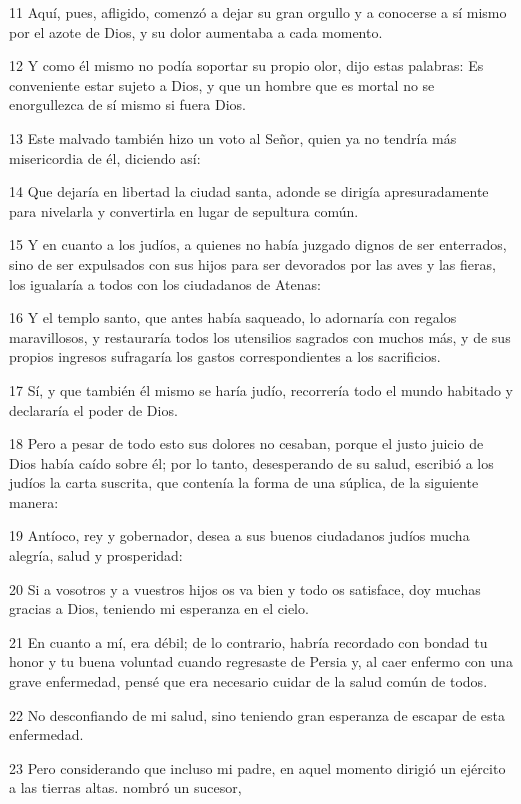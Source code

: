 \par 11 Aquí, pues, afligido, comenzó a dejar su gran orgullo y a conocerse a sí mismo por el azote de Dios, y su dolor aumentaba a cada momento.
\par 12 Y como él mismo no podía soportar su propio olor, dijo estas palabras: Es conveniente estar sujeto a Dios, y que un hombre que es mortal no se enorgullezca de sí mismo si fuera Dios.
\par 13 Este malvado también hizo un voto al Señor, quien ya no tendría más misericordia de él, diciendo así:
\par 14 Que dejaría en libertad la ciudad santa, adonde se dirigía apresuradamente para nivelarla y convertirla en lugar de sepultura común.
\par 15 Y en cuanto a los judíos, a quienes no había juzgado dignos de ser enterrados, sino de ser expulsados ​​con sus hijos para ser devorados por las aves y las fieras, los igualaría a todos con los ciudadanos de Atenas:
\par 16 Y el templo santo, que antes había saqueado, lo adornaría con regalos maravillosos, y restauraría todos los utensilios sagrados con muchos más, y de sus propios ingresos sufragaría los gastos correspondientes a los sacrificios.
\par 17 Sí, y que también él mismo se haría judío, recorrería todo el mundo habitado y declararía el poder de Dios.
\par 18 Pero a pesar de todo esto sus dolores no cesaban, porque el justo juicio de Dios había caído sobre él; por lo tanto, desesperando de su salud, escribió a los judíos la carta suscrita, que contenía la forma de una súplica, de la siguiente manera:
\par 19 Antíoco, rey y gobernador, desea a sus buenos ciudadanos judíos mucha alegría, salud y prosperidad:
\par 20 Si a vosotros y a vuestros hijos os va bien y todo os satisface, doy muchas gracias a Dios, teniendo mi esperanza en el cielo.
\par 21 En cuanto a mí, era débil; de lo contrario, habría recordado con bondad tu honor y tu buena voluntad cuando regresaste de Persia y, al caer enfermo con una grave enfermedad, pensé que era necesario cuidar de la salud común de todos.
\par 22 No desconfiando de mi salud, sino teniendo gran esperanza de escapar de esta enfermedad.
\par 23 Pero considerando que incluso mi padre, en aquel momento dirigió un ejército a las tierras altas. nombró un sucesor,
